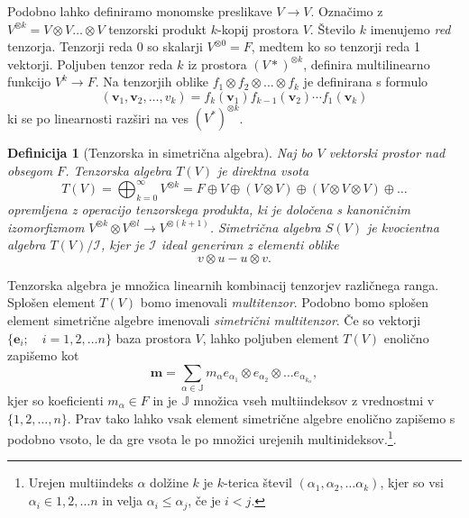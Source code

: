 \documentclass{article}
\newcommand{\JJ}{\mathbb{J}}
\newcommand{\e}{\mathbf{e}}
\newcommand{\m}{\mathbf{m}}
\newcommand{\vv}{\mathbf{v}}
\newtheorem{definicija}{Definicija}[section]
\begin{document}
Podobno lahko definiramo monomske preslikave $V\to V$. Označimo z $V^{\otimes k}
= V\otimes V\ldots \otimes V$ tenzorski produkt $k$-kopij prostora $V$. Število
$k$ imenujemo \emph{red} tenzorja. Tenzorji reda $0$  so skalarji $V^{\otimes
  0}=F$, medtem ko so tenzorji reda 1 vektorji. Poljuben tenzor reda $k$ iz
prostora $(V*)^{\otimes k}$, definira multilinearno funkcijo $V^k\to F$. Na
tenzorjih oblike $f_1\otimes f_2\otimes \ldots\otimes f_k$ je definirana s
formulo
\begin{equation}
  \label{eq:multilinear_f}
  (\vv_1,\vv_2,\ldots,v_k) = f_k(\vv_1)f_{k-1}(\vv_2)\cdots f_1(\vv_k)
\end{equation}
ki se po linearnosti razširi na ves $(V^*)^{\otimes k}$.
\begin{definicija}[Tenzorska in simetrična algebra]
  Naj bo $V$ vektorski prostor nad obsegom $F$. \emph{Tenzorska algebra} $T(V)$ je direktna vsota
  \begin{equation}
    \label{eq:tenzorska_algebra}
    T(V)=\bigoplus_{k=0}^\infty V^{\otimes k}=F\oplus V\oplus (V\otimes V)\oplus (V\otimes V\otimes V)\oplus\ldots
  \end{equation}
opremljena z operacijo tenzorskega produkta, ki je določena s kanoničnim
izomorfizmom $V^{\otimes k}\otimes V^{\otimes l}\to V^{\otimes (k+1)}$. 
\emph{Simetrična algebra} $S(V)$ je kvocientna algebra $T(V)/\mathcal{I}$, kjer
je $\mathcal{I}$ ideal generiran z elementi oblike
\begin{equation}
  \label{eq:simetricna_algebra}
  v\otimes u -u\otimes v.
\end{equation}
\end{definicija}
Tenzorska algebra je množica linearnih kombinacij tenzorjev različnega ranga.
Splošen element $T(V)$ bomo imenovali
\emph{multitenzor}. Podobno bomo splošen element simetrične algebre imenovali
\emph{simetrični multitenzor}.
Če so vektorji  $\{\e_i;\quad i=1,2,\ldots n\}$ baza prostora $V$, lahko poljuben
element $T(V)$ enolično zapišemo kot
\begin{equation}
  \label{eq:multitenzor}
  \m = \sum_{\alpha\in \JJ}m_\alpha e_{\alpha_1}\otimes e_{\alpha_2}\otimes\ldots e_{\alpha_{k_\alpha}},
\end{equation}
kjer so koeficienti $m_\alpha\in F$ in je $\JJ$ množica vseh multiindeksov z
vrednostmi v $\{1,2,\ldots,n\}$. Prav tako lahko vsak element simetrične algebre
enolično zapišemo s podobno vsoto, le da gre vsota le po množici urejenih multinideksov.\footnote{Urejen multiindeks $\alpha$ dolžine $k$ je $k$-terica
števil $(\alpha_1,\alpha_2, \ldots \alpha_k)$, kjer so vsi
$\alpha_i\in{1,2,\ldots n}$ in velja $\alpha_i\le\alpha_j$, če je $i<j$.}.
 
\end{document}
